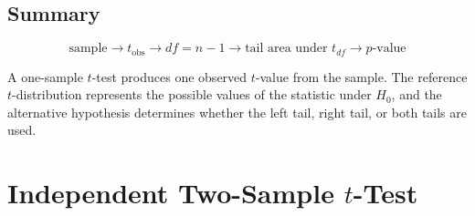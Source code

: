 \documentclass[11pt]{article}
\begin{document}
\subsection{Summary}
\[
\boxed{
\text{sample}
\rightarrow t_{\mathrm{obs}}
\rightarrow df=n-1
\rightarrow \text{tail area under }t_{df}
\rightarrow p\text{-value}
}
\]

A one-sample \(t\)-test produces one observed \(t\)-value from the sample. The reference \(t\)-distribution represents the possible values of the statistic under \(H_0\), and the alternative hypothesis determines whether the left tail, right tail, or both tails are used.

\section{Independent Two-Sample \(t\)-Test}
\end{document}
